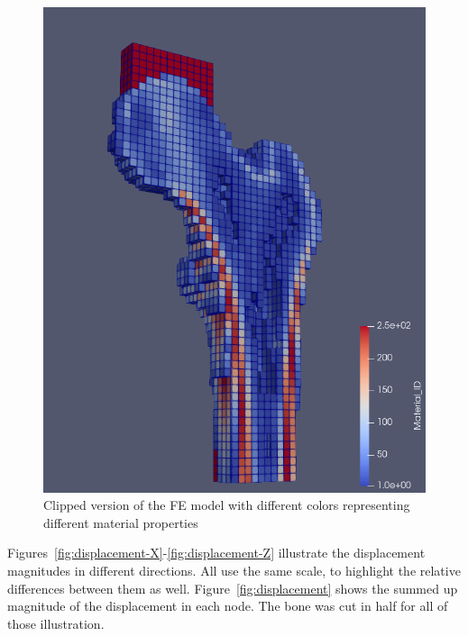 \documentclass[a4paper,12pt]{article}
\begin{document}
\begin{figure}[htbp]
\begin{minipage}[b]{0.49\textwidth}
            \label{fig:model}
        \end{minipage}
        \hfill
        \begin{minipage}[b]{0.49\textwidth}
            \includegraphics[width=\textwidth]{model_cut}
            \caption{Clipped version of the FE model with different colors representing different material properties}
            \label{fig:model_cut}
        \end{minipage}
    \end{figure}

    \vspace{10pt}
    Figures~\ref{fig:displacement-X}-\ref{fig:displacement-Z} illustrate the displacement magnitudes in different directions.
    All use the same scale, to highlight the relative differences between them as well.
    Figure~\ref{fig:displacement} shows the summed up magnitude of the displacement in each node.
    The bone was cut in half for all of those illustration.
\end{document}
